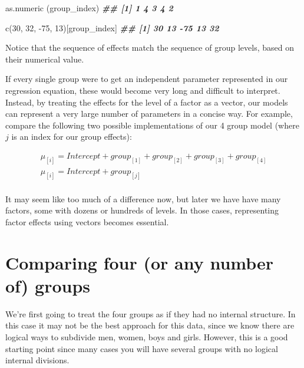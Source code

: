 \documentclass[
]{book}
\newenvironment{Shaded}{\begin{snugshade}}{\end{snugshade}}
\newcommand{\DecValTok}[1]{\textcolor[rgb]{0.00,0.00,0.81}{#1}}
\newcommand{\DocumentationTok}[1]{\textcolor[rgb]{0.56,0.35,0.01}{\textbf{\textit{#1}}}}
\newcommand{\FunctionTok}[1]{\textcolor[rgb]{0.00,0.00,0.00}{#1}}
\newcommand{\NormalTok}[1]{#1}
\newcommand{\SpecialCharTok}[1]{\textcolor[rgb]{0.00,0.00,0.00}{#1}}
\begin{document}
\begin{Shaded}
\begin{Highlighting}[]
\FunctionTok{as.numeric}\NormalTok{ (group\_index)}
\DocumentationTok{\#\# [1] 1 4 3 4 2}

\FunctionTok{c}\NormalTok{(}\DecValTok{30}\NormalTok{, }\DecValTok{32}\NormalTok{, }\SpecialCharTok{{-}}\DecValTok{75}\NormalTok{, }\DecValTok{13}\NormalTok{)[group\_index]}
\DocumentationTok{\#\# [1]  30  13 {-}75  13  32}
\end{Highlighting}
\end{Shaded}

Notice that the sequence of effects match the sequence of group levels, based on their numerical value.

If every single group were to get an independent parameter represented in our regression equation, these would become very long and difficult to interpret. Instead, by treating the effects for the level of a factor as a vector, our models can represent a very large number of parameters in a concise way. For example, compare the following two possible implementations of our 4 group model (where \(j\) is an index for our group effects):

\begin{equation}
\begin{split}
\mu_{[i]} = Intercept + group_{[1]} + group_{[2]} + group_{[3]} + group_{[4]} \\
\mu_{[i]} = Intercept + group_{[j]} \\
\end{split}
\label{eq:40}
\end{equation}

It may seem like too much of a difference now, but later we have have many factors, some with dozens or hundreds of levels. In those cases, representing factor effects using vectors becomes essential.

\hypertarget{comparing-four-or-any-number-of-groups}{%
\section{Comparing four (or any number of) groups}\label{comparing-four-or-any-number-of-groups}}

We're first going to treat the four groups as if they had no internal structure. In this case it may not be the best approach for this data, since we know there are logical ways to subdivide men, women, boys and girls. However, this is a good starting point since many cases you will have several groups with no logical internal divisions.
\end{document}
